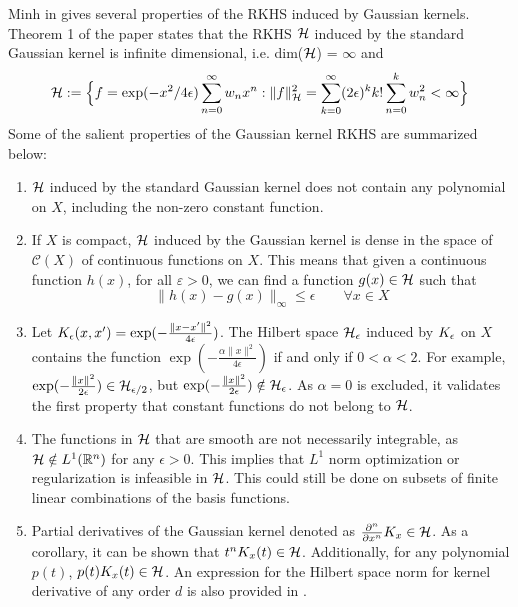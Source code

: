 Minh in \cite{min10} gives several properties of the RKHS induced by Gaussian kernels. Theorem 1 of the paper states that the RKHS ${\cal H}$ induced by the standard Gaussian kernel is infinite dimensional, i.e. dim(${\cal H}$) = $\infty$ and 
\[
{\cal H} := \Bigl\{ f = \exp(-x^2/4\epsilon) \sum_{n=0}^\infty w_n x^n: \|f\|^2_{\cal H} = \sum_{k=0}^\infty (2\epsilon)^k k! \sum_{n=0}^k w_n^2 <\infty \Bigr\}
\]
Some of the salient properties of the Gaussian kernel RKHS are summarized below: 
\begin{enumerate}
	\item ${\cal H}$ induced by the standard Gaussian kernel does not contain any polynomial on $X$, including the non-zero constant function. 
	
	\item If $X$ is compact, ${\cal H}$ induced by the Gaussian kernel is dense in the space of $\mathcal{C}(X)$ of continuous functions on $X$.
	This means that given a continuous function $h(x)$, for all $\varepsilon >0$, we can find a function $g(x) \in {\cal H}$ such that 
	\[
	\|h(x) - g(x)\|_\infty \leq \epsilon \qquad \forall x \in X
	\] 
	\item Let $K_{\epsilon}(x,x') = \exp(-\frac{\|x-x'\|^2}{4\epsilon})$. The Hilbert space ${\cal H}_\epsilon$ induced by $K_\epsilon$ on $X$ contains the function $\exp(-\frac{\alpha \|x\|^2} {4 \epsilon})$ if and only if $0<\alpha <2$. For example, $\exp(-\frac{\|x\|^2}{2 \epsilon}) \in {\cal H}_{\epsilon/2}$, but  $\exp(-\frac{\|x\|^2}{2 \epsilon}) \notin {\cal H}_{\epsilon}$. As $\alpha=0$ is excluded, it validates the first property that constant functions do not belong to ${\cal H}$.
	
	\item The functions in ${\cal H}$ that are smooth are not necessarily integrable, as ${\cal H} \notin L^1(\mathbb{R}^n)$ for any $\epsilon >0$.  This implies that $L^1$ norm optimization or regularization is infeasible in ${\cal H}$. This could still be done on subsets of finite linear combinations of the basis functions.
	

\item Partial derivatives of the Gaussian kernel denoted as $\frac{\partial^n}{\partial x^n} K_x \in {\cal H}$. As a corollary, it can be shown that $t^n K_x(t)\in{\cal H}$. Additionally, for any polynomial $p(t)$, $p(t) K_x(t) \in {\cal H}$. An expression for the Hilbert space norm for kernel derivative of any order $d$ is also provided in \cite{min10}. 
\end{enumerate}

